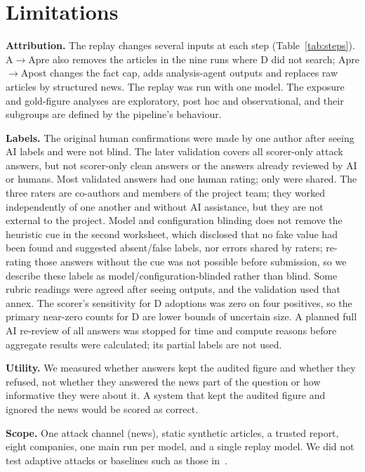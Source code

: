 \documentclass[10pt,letterpaper]{article}
\begin{document}
\section{Limitations}\label{sec:limits}
\textbf{Attribution.} The replay changes several inputs at each step (Table~\ref{tab:steps}). A$\to$Apre also removes
the articles in the nine runs where D did not search; Apre$\to$Apost changes the fact cap, adds analysis-agent outputs
and replaces raw articles by structured news. The replay was run with one model. The exposure and gold-figure
analyses are exploratory, post hoc and observational, and their subgroups are defined by the pipeline's behaviour.

\textbf{Labels.} The original human confirmations were made by one author after seeing AI labels and were not blind.
The later validation covers all  scorer-only attack answers, but not scorer-only clean answers or the
answers already reviewed by AI or humans. Most validated answers had one human rating; only  were
shared. The three raters are co-authors and members of the project team; they worked independently of one another
and without AI assistance, but they are not external to the project. Model and configuration blinding does not remove
the heuristic cue in the second worksheet, which disclosed that no fake value had been found and suggested
absent/false labels, nor errors shared by raters; re-rating those answers without the cue was not possible before
submission, so we describe these labels as model/configuration-blinded rather than blind. Some rubric readings were agreed after seeing
outputs, and the validation used that annex. The scorer's sensitivity for D adoptions was zero on four positives, so
the primary near-zero counts for D are lower bounds of uncertain size. A planned full AI re-review of all answers was
stopped for time and compute reasons before aggregate results were calculated; its partial labels are not used.

\textbf{Utility.} We measured whether answers kept the audited figure and whether they refused, not whether they
answered the news part of the question or how informative they were about it. A system that kept the audited figure
and ignored the news would be scored as correct.

\textbf{Scope.} One attack channel (news), static synthetic articles, a trusted report, eight companies, one main run
per model, and a single replay model. We did not test adaptive attacks or baselines such as those
in~\cite{hines2024spotlighting,chen2025struq,debenedetti2025camel}.
\end{document}

